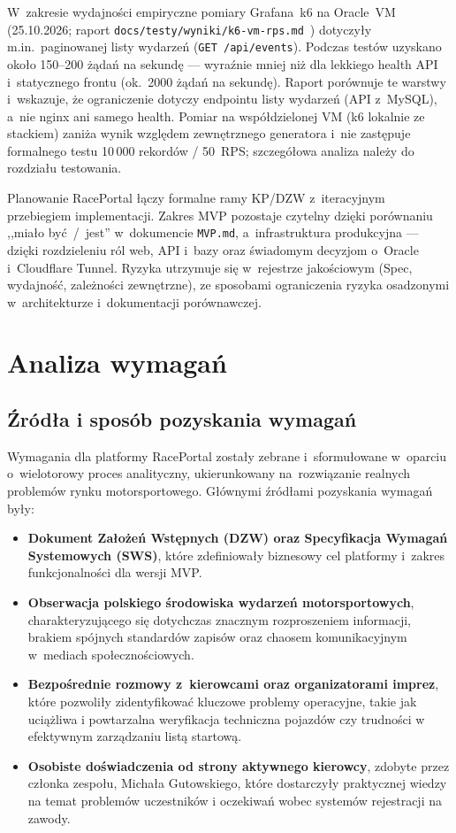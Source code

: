 \documentclass{sprz}
\begin{document}
W~zakresie wydajności empiryczne pomiary Grafana~k6 na Oracle~VM (25.10.2026; raport \texttt{docs/\allowbreak testy/\allowbreak wyniki/\allowbreak k6-vm-rps.md}~\cite{k6:vm-rps}) dotyczyły m.in.\ paginowanej listy wydarzeń (\texttt{GET /api/events}). Podczas testów uzyskano około 150--200 żądań na sekundę --- wyraźnie mniej niż dla lekkiego health API i~statycznego frontu (ok.\ 2000 żądań na sekundę). Raport porównuje te warstwy i~wskazuje, że ograniczenie dotyczy endpointu listy wydarzeń (API z~MySQL), a~nie nginx ani samego health. Pomiar na współdzielonej VM (k6 lokalnie ze stackiem) zaniża wynik względem zewnętrznego generatora i~nie zastępuje formalnego testu 10\,000 rekordów / 50~RPS; szczegółowa analiza należy do rozdziału testowania.

Planowanie RacePortal łączy formalne ramy KP/DZW z~iteracyjnym przebiegiem implementacji. Zakres MVP pozostaje czytelny dzięki porównaniu ,,miało być~/~jest'' w~dokumencie \texttt{MVP.md}, a~infrastruktura produkcyjna --- dzięki rozdzieleniu ról web, API i~bazy oraz świadomym decyzjom o~Oracle i~Cloudflare Tunnel. Ryzyka utrzymuje się w~rejestrze jakościowym (Spec, wydajność, zależności zewnętrzne), ze sposobami ograniczenia ryzyka osadzonymi w~architekturze i~dokumentacji porównawczej.

\chapter{Analiza wymagań}
\label{ch:wymagania}

\section{Źródła i sposób pozyskania wymagań}
Wymagania dla platformy RacePortal zostały zebrane i~sformułowane w~oparciu o~wielotorowy proces analityczny, ukierunkowany na~rozwiązanie realnych problemów rynku motorsportowego. Głównymi źródłami pozyskania wymagań były:
\begin{itemize}
  \item \textbf{Dokument Założeń Wstępnych (DZW) oraz Specyfikacja Wymagań Systemowych (SWS)}, które zdefiniowały biznesowy cel platformy i~zakres funkcjonalności dla wersji MVP.
  \item \textbf{Obserwacja polskiego środowiska wydarzeń motorsportowych}, charakteryzującego się dotychczas znacznym rozproszeniem informacji, brakiem spójnych standardów zapisów oraz chaosem komunikacyjnym w~mediach społecznościowych.
  \item \textbf{Bezpośrednie rozmowy z~kierowcami oraz organizatorami imprez}, które pozwoliły zidentyfikować kluczowe problemy operacyjne, takie jak uciążliwa i powtarzalna weryfikacja techniczna pojazdów czy trudności w efektywnym zarządzaniu listą startową.
  \item \textbf{Osobiste doświadczenia od strony aktywnego kierowcy}, zdobyte przez członka zespołu, Michała Gutowskiego, które dostarczyły praktycznej wiedzy na temat problemów uczestników i oczekiwań wobec systemów rejestracji na zawody.
\end{itemize}
\end{document}
